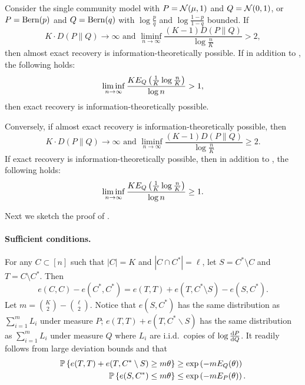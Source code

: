 \begin{theorem}\label{thm:weak_general}
Consider the single community model with $P={\mathcal{N}}(\mu,1)$ and $Q={\mathcal{N}}(0,1)$, or 
$P={\rm Bern}(p)$ and $Q={\rm Bern}(q)$ with $\log \frac{p}{q}$ and $\log \frac{1-p}{1-q}$ bounded.  
If
\begin{equation}
	 K  \cdot D(P\|Q) \to \infty   \text{ and }
	 \liminf_{n\to\infty} \frac{(K-1)  D(P\|Q)}{\log \frac{n }{K}}> 2,  
	 \label{eq:weak-bdd_suff}
\end{equation}
then almost exact recovery is information-theoretically possible. If in addition to , the following holds:
\begin{equation}
\liminf_{n\to\infty} \frac{K E_Q\left( \frac{1}{K} \log \frac{n}{K} \right)}{\log n} > 1,
	\label{eq:voting-suff}
\end{equation}
then exact recovery is information-theoretically possible. 

Conversely, if almost exact recovery is information-theoretically possible, then 
\begin{equation}
	K \cdot D(P\|Q) \to \infty   \text{ and } \liminf_{n\to\infty} \frac{(K-1) D(P\|Q)}{\log \frac{n }{K}} \ge 2.
	\label{eq:weak-bdd_nec}
	\end{equation}
If exact recovery is information-theoretically possible, then in addition  to , the following holds:
\begin{equation}
\liminf_{n\to\infty} \frac{K E_Q\left( \frac{1}{K} \log \frac{n}{K} \right)}{\log n} \ge 1.
	\label{eq:voting-nec}
\end{equation}
\end{theorem}



Next we sketch the proof of .

\paragraph{Sufficient conditions.}
 For any $C\subset[n]$ such that $|C|=K$ and $| C \cap C^*| = \ell$, 
let $S=C^*\setminus C$ and $T=C \setminus C^*$. Then 
$$
e(C, C) - e(C^*, C^*) = e( T, T) + e(T, C^*\setminus S) - e(S, C^*). 
$$
Let $m=  \binom{K}{2}-\binom{\ell}{2}$. 
Notice that $e(S,C^*)$ has the same distribution as $ \sum_{i=1}^m L_i$ under measure $P$;
$e(T,  T) + e(T, C^\ast \backslash S)$ has the same distribution as $ \sum_{i=1}^m L_i$ under measure $Q$
where $L_i$ are i.i.d.\ copies of $\log \frac{ {\rm d} P}{ {\rm d} Q} $.
It readily follows from large deviation bounds  and  that 
\begin{align}
\mathbb{P}\left\{  e(T, T) + e(T, C^* \setminus S) \ge m \theta  \right\} & \ge   \exp \left(- m E_Q(\theta) \right)  \nonumber \\
\mathbb{P}\left\{  e(S, C^*)  \leq m \theta  \right\} & \le \exp \left( - m E_P(\theta) \right).  \label{eq:LDbounds}
\end{align}


